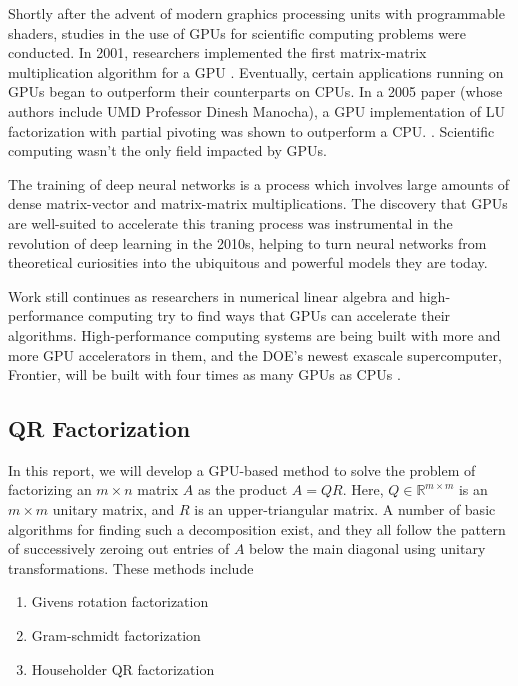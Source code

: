 \documentclass[12pt]{article}
\begin{document}
Shortly after the advent of modern graphics processing units with programmable shaders, 
studies in the use of GPUs for scientific computing problems were conducted. In 2001, 
researchers implemented the first matrix-matrix multiplication algorithm for a GPU 
\cite{10.1145/582034.582089}. Eventually, certain applications running on GPUs began to 
outperform their counterparts on CPUs. In a 2005 paper (whose authors include UMD 
Professor Dinesh Manocha), a GPU implementation of LU factorization with partial 
pivoting was shown to outperform a CPU. \cite{1559955}. Scientific computing wasn't the only
field impacted by GPUs.

The training of deep neural networks is a process which involves large amounts of dense
matrix-vector and matrix-matrix multiplications. The discovery that GPUs are well-suited 
to accelerate this traning process was instrumental in the revolution of deep learning 
in the 2010s, helping to turn neural networks from theoretical curiosities into the 
ubiquitous and powerful models they are today.

Work still continues as researchers in numerical linear algebra and high-performance 
computing try to find ways that GPUs can accelerate their algorithms. High-performance 
computing systems are being built with more and more GPU accelerators in them, 
and the DOE's newest exascale supercomputer, Frontier, will be built with four times 
as many GPUs as CPUs \cite{frontier}.

\subsection*{QR Factorization}

In this report, we will develop a GPU-based method to solve the problem of factorizing 
an $m \times n$ matrix $A$ as the product $A = QR$. Here, $Q \in \mathbb{R}^{m \times m}$ 
is an $m \times m$ unitary matrix, and $R$ is an upper-triangular matrix. A number of basic
algorithms for finding such a decomposition exist, and they all follow the pattern of
successively zeroing out entries of $A$ below the main diagonal using unitary transformations.
These methods include

\begin{enumerate}
    \item Givens rotation factorization
    \item Gram-schmidt factorization
    \item Householder QR factorization
\end{enumerate}
\end{document}
